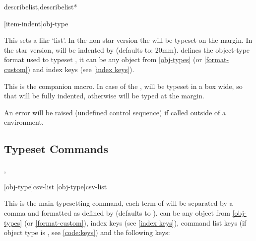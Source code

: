 \documentclass{article}
\begin{document}
\begin{codedescribe}[env]{describelist,describelist*}
  \begin{codesyntax}
\tsmacro{\begin{describelist}}[item-indent]{obj-type}
  ~~
  ~~
\tsmacro{\end{describelist}}{}
  \end{codesyntax}
This sets a  like `list'. In the non-star version the  will be typeset on the margin. In the star version,  will be indented by  (defaults to: 20mm).
 defines the object-type format used to typeset , it can be any object from \ref{obj-types} (or \ref{format-custom}) and index keys (see \ref{index keys}).
\end{codedescribe}


\begin{codedescribe}[code]{\describe}
\begin{codesyntax}
\end{codesyntax}
This is the  companion macro. In case of the ,  will be typeset in a box  wide, so that  will be fully indented, otherwise  will be typed at the margin.
\end{codedescribe}

\begin{tsremark}
An error will be raised (undefined control sequence) if called outside of a  environment.
\end{tsremark}


\subsection{Typeset Commands}\label{ts-commands}

\begin{codedescribe}[code,update=2025/05/29]{\typesetobj,\tsobj}
\begin{codesyntax}
\tsmacro{\typesetobj}[obj-type]{csv-list}
\tsmacro{\tsobj}[obj-type]{csv-list}
\end{codesyntax}
This is the main typesetting command, each term of  will be separated by a comma and formatted as defined by  (defaults to ).  can be any object from \ref{obj-types} (or \ref{format-custom}), index keys (see \ref{index keys}), command list keys (if object type is , see \ref{code:keys}) and the following keys:
\end{codedescribe}
\end{document}
